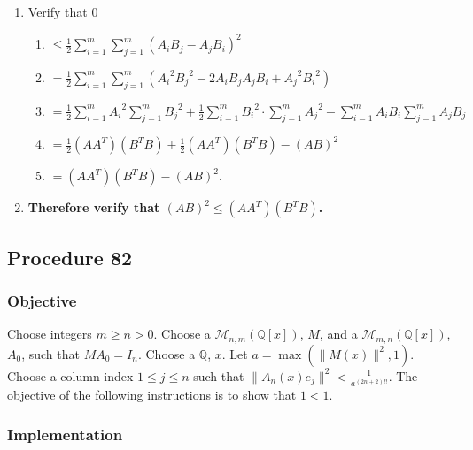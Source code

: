 \documentclass[twocolumn]{article}
\newcommand{\procedure}[2][]{\subsection*{Procedure #2 \ifthenelse{\equal{#1}{}}{}{(#1)}}\label{sec:procedure #2}}
\newcommand{\objective}{\subsubsection*{Objective}}
\newcommand{\implementation}{\subsubsection*{Implementation}}
\begin{document}
				\begin{enumerate}
					\item Verify that $0$
					\begin{enumerate}
						\item $\le\frac{1}{2}\sum_{i=1}^m\sum_{j=1}^m (A_iB_j-A_jB_i)^2$
						\item $=\frac{1}{2}\sum_{i=1}^m\sum_{j=1}^m ({A_i}^2{B_j}^2-2A_iB_jA_jB_i+{A_j}^2{B_i}^2)$
						\item $=\frac{1}{2}\sum_{i=1}^m {A_i}^2\sum_{j=1}^m {B_j}^2+\frac{1}{2}\sum_{i=1}^m {B_i}^2\cdot\allowbreak\sum_{j=1}^m {A_j}^2-\sum_{i=1}^m A_iB_i\sum_{j=1}^m A_jB_j$
						\item $=\frac{1}{2}(AA^T)(B^TB)+\frac{1}{2}(AA^T)(B^TB)-(AB)^2$
						\item $=(AA^T)(B^TB)-(AB)^2$.
					\end{enumerate}
					\item \textbf{Therefore verify that $(AB)^2\le(AA^T)(B^TB)$.}
				\end{enumerate}
		\procedure{82}
			\objective
				Choose integers $m\ge n>0$. Choose a $\mathcal{M}_{n,m}(\mathbb{Q}[x])$, $M$, and a $\mathcal{M}_{m,n}(\mathbb{Q}[x])$, $A_0$, such that $MA_0=I_n$. Choose a $\mathbb{Q}$, $x$. Let $a=\max(\lVert M(x)\rVert^2,1)$. Choose a column index $1\le j\le n$ such that $\lVert A_n(x)e_j\rVert^2<\frac{1}{a^{(2n+2)!!}}$. The objective of the following instructions is to show that $1<1$.
			\implementation
\end{document}
